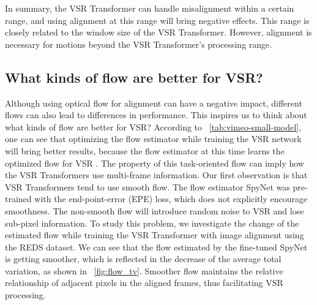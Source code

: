 \documentclass{article}
\begin{document}
In summary, the VSR Transformer can handle misalignment within a certain range, and using alignment at this range will bring negative effects.
This range is closely related to the window size of the VSR Transformer.
However, alignment is necessary for motions beyond the VSR Transformer's processing range.


\vspace{-2mm}
\subsection{What kinds of flow are better for VSR?}
\label{sec:rethinking:flowshift}
\vspace{-2mm}
Although using optical flow for alignment can have a negative impact, different flows can also lead to differences in performance.
This inspires us to think about what kinds of flow are better for VSR?
According to \tablename~\ref{tab:vimeo-small-model}, one can see that optimizing the flow estimator while training the VSR network will bring better results, because the flow estimator at this time learns the optimized flow for VSR \cite{xue2019video}.
The property of this task-oriented flow can imply how the VSR Transformers use multi-frame information.
Our first observation is that VSR Transformers tend to use smooth flow.
The flow estimator SpyNet was pre-trained with the end-point-error (EPE) loss, which does not explicitly encourage smoothness.
The non-smooth flow will introduce random noise to VSR and lose sub-pixel information.
To study this problem, we investigate the change of the estimated flow while training the VSR Transformer with image alignment using the REDS dataset.
We can see that the flow estimated by the fine-tuned SpyNet is getting smoother, which is reflected in the decrease of the average total variation, as shown in \figurename~\ref{fig:flow_tv}.
Smoother flow maintains the relative relationship of adjacent pixels in the aligned frames, thus facilitating VSR processing.
\end{document}
